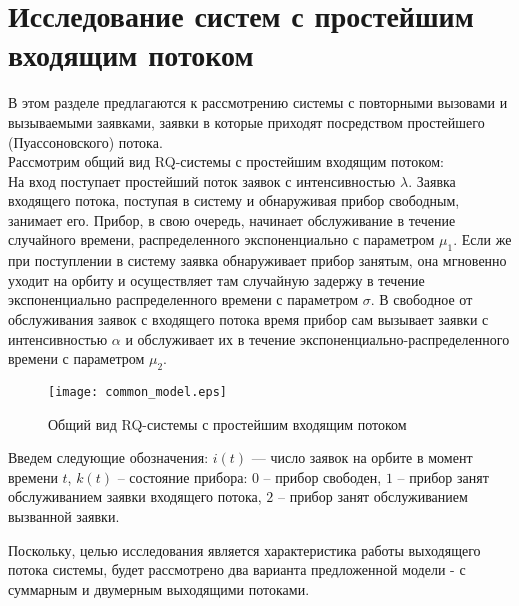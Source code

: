 \section {Исследование систем с простейшим входящим потоком}
В этом разделе предлагаются к рассмотрению системы с повторными вызовами и вызываемыми заявками, заявки в которые приходят посредством простейшего (Пуассоновского) потока.\\
Рассмотрим общий вид RQ-системы с простейшим входящим потоком:\\
 На вход поступает простейший поток заявок с интенсивностью $\lambda$. Заявка входящего потока, поступая в систему и обнаруживая прибор свободным, занимает его. Прибор, в свою очередь, начинает обслуживание в течение случайного времени, распределенного экспоненциально с параметром $\mu_{1}$. Если же при поступлении в систему заявка обнаруживает прибор занятым, она мгновенно уходит на орбиту и осуществляет там случайную задержу в течение экспоненциально распределенного времени с параметром $\sigma$. В свободное от обслуживания заявок с входящего потока время прибор сам вызывает заявки с интенсивностью $\alpha$ и обслуживает их в течение экспоненциально-распределенного времени с параметром $\mu_{2}$.
\begin{figure}[H]
	\centering
	\texttt{[image: common\_model.eps]}
	\caption{Общий вид RQ-системы с простейшим входящим потоком}
	\label{common_model_fig}
\end{figure}
Введем следующие обозначения: $i(t)$ — число заявок на орбите в момент времени $t$, $k(t)$ – состояние прибора: $0$ – прибор свободен, $1$ – прибор занят обслуживанием заявки входящего потока, $2$ – прибор занят обслуживанием вызванной заявки. 
 
Поскольку, целью исследования является характеристика работы выходящего потока системы, будет рассмотрено два варианта предложенной модели - с суммарным и двумерным выходящими потоками.



